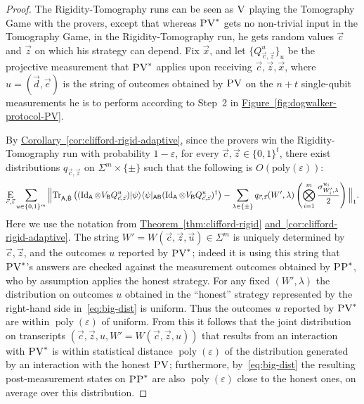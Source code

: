 \documentclass[11pt]{article}
\numberwithin{equation}{section}
\theoremstyle{definition}
\theoremstyle{plain}
\newcommand{\expref}[2]{\hyperref[#2]{#1~\ref{#2}}}
\newcommand{\ket}[1]{|#1\rangle}
\newcommand{\bra}[1]{\langle#1|}
\newcommand{\Tr}{\mbox{\rm Tr}}
\newcommand{\Id}{\ensuremath{\mathop{\rm Id}\nolimits}}
\newcommand{\Es}[1]{\ensuremath{\mathop{\textsc{E}}}_{#1}} %
\DeclareMathOperator{\poly}{poly}
\newcommand{\reg}[1]{{\textsf{#1}}}
\newcommand{\eps}{\varepsilon}
\newcommand{\ver}{\textsc{V}}
\newcommand{\pv}{\textsc{PV}}
\newcommand{\pp}{\textsc{PP}}
\begin{document}
\begin{proof}
The Rigidity-Tomography runs can be seen as $\ver$ playing the Tomography Game
  with the provers, except that whereas $\pv^*$ gets no non-trivial input in the
  Tomography Game, in the Rigidity-Tomography run, he gets random values
  $\vec{c}$ and $\vec{z}$ on which his strategy can depend. Fix $\vec{x}$, and let
  $\{Q_{\vec{c},\vec{z}}^{u}\}_{u}$ be the projective measurement that $\pv^*$
  applies upon receiving $\vec{c},\vec{z},\vec{x}$, where  $u = (\vec{d},\vec{e})$ is
  the string of outcomes obtained by $\pv$ on the $n+t$ single-qubit
  measurements he is to perform according to Step~2 in
  \expref{Figure}{fig:dogwalker-protocol-PV}. 

By \expref{Corollary}{cor:clifford-rigid-adaptive}, since the provers win the Rigidity-Tomography run with probability $1-\eps$, for every $\vec{c},\vec{z}\in\{0,1\}^t$,
there exist distributions $q_{\vec{c},\vec{z}}$ on $\Sigma^m\times\{\pm\}$ such that the following is $O(\mathrm{poly}(\eps))$:
\begin{equation}\label{eq:big-dist}
\Es{\vec{c},\vec{z}}\sum_{ u\in \{0, 1\}^m}
\Big\| \Tr_{\reg{A},\hat{\reg{B}}}\left((\Id_{\reg{A}}\otimes V_{\reg{B}} Q_{\vec{c},\vec{z}}^{u})\ket{\psi}\bra{\psi}_{\reg{AB}}(\Id_{\reg{A}}\otimes V_{\reg{B}} Q_{\vec{c},\vec{z}}^{u})^\dagger\right)
- \sum_{\lambda\in\{\pm\}}q_{\vec{c},\vec{z}}(W',\lambda)\left(\bigotimes_{i=1}^m \frac{\sigma^{u_i}_{W_i',\lambda}}{2}\right)\Big\|_1. 
\end{equation}
Here we use the notation from \expref{Theorem}{thm:clifford-rigid}
\expref{and}{cor:clifford-rigid-adaptive}. The string
  $W'=W(\vec{c},\vec{z},\vec{u})\in\Sigma^m$ is uniquely determined by
  $\vec{c},\vec{z}$, and the outcomes ${u}$ reported by $\pv^*$; indeed it
  is using this string that $\pv^*$'s answers are checked against the
  measurement outcomes obtained by $\pp^*$, who by assumption applies the
  honest strategy. For any fixed $(W',\lambda)$ the distribution on
  outcomes $u$ obtained in the ``honest'' strategy represented by the right-hand
  side in~\eqref{eq:big-dist} is uniform. Thus the outcomes $u$ reported by
  $\pv^*$ are within $\poly(\eps)$ of uniform. From this it follows that the joint distribution on transcripts $(\vec{c},\vec{z},u,W'=W(\vec{c},\vec{z},u))$ that results from an interaction with $\pv^*$ is within statistical distance $\poly(\eps)$ of the distribution generated by an interaction with the honest $\pv$; furthermore, by~\eqref{eq:big-dist} the resulting post-measurement states on $\pp^*$ are also $\poly(\eps)$ close to the honest ones, on average over this distribution. 


\end{proof}
\end{document}
